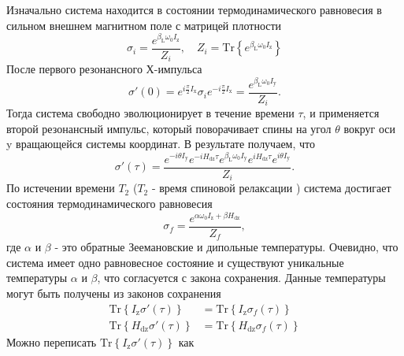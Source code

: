 \documentclass[utf8]{jetp}
\begin{document}
Изначально система находится в состоянии термодинамического равновесия в сильном внешнем магнитном поле с матрицей плотности
%
\begin{equation}
    \label{eq:a1}
   \sigma_{i} = \dfrac{e^{\beta_\mathrm{L} \omega_{0} I_\mathrm{z}}}{Z_{i}} ,
   \quad
   Z_{i} = \mathrm{Tr}\left\{e^{\beta_\mathrm{L} \omega_{0} I_\mathrm{z}} \right\}
\end{equation}
%
После первого резонансного Х-импульса
%
\begin{equation}
    \label{eq:a2}
    \sigma'(0) = e^{ i \frac \pi 2 I_\mathrm{x}}
    \sigma_{i}
    e^{-i \frac \pi 2 I_\mathrm{x}}
    = \dfrac{e^{\beta_\mathrm{L} \omega_{0} I_\mathrm{y}}}{Z_{i}}  .
\end{equation}
%
Тогда система свободно эволюционирует в течение времени $\tau$,
и применяется второй резонансный импульс, который поворачивает спины на угол $\theta$ вокруг оси y вращающейся системы координат.
В результате получаем, что
\begin{equation}
    \label{eq:a3}
    \sigma'(\tau) 
    = \dfrac{
      e^{-i \theta I_\mathrm{y}} e^{-i H_\mathrm{dz} \tau} 
      e^{\beta_\mathrm{L} \omega_{0} I_\mathrm{y}}
      e^{i H_\mathrm{dz} \tau} e^{i \theta I_\mathrm{y}}
    }{Z_{i}}. 
\end{equation}
%
По истечении времени $T_2$ ($T_2$ - время спиновой релаксации \cite{Goldman_1970}) система достигает состояния термодинамического равновесия
\begin{equation}
    \label{eq:a4}
    \sigma_{f} 
    = \dfrac{ e^{\alpha \omega_{0} I_\mathrm{z} + \beta H_\mathrm{dz}} }{Z_f},
\end{equation}
%
где $\alpha$ и $\beta$ - это обратные Зеемановские и дипольные температуры.
Очевидно, что система имеет одно равновесное состояние 
и существуют уникальные температуры $\alpha$ и $\beta$,
что согласуется с закона сохранения.
Данные температуры могут быть получены из законов сохранения
\begin{align}
    \label{eq:a5}
    \mathrm{Tr} \left\{ I_\mathrm{z} \sigma'(\tau) \right\}
    & = \mathrm{Tr} \left\{ I_\mathrm{z} \sigma_{f}(\tau) \right\}
    \\
    \label{eq:a6}
    \mathrm{Tr} \left\{ H_\mathrm{dz} \sigma'(\tau) \right\}
    & = \mathrm{Tr} \left\{ H_\mathrm{dz} \sigma_{f}(\tau) \right\}
\end{align}
%
Можно переписать $\mathrm{Tr} \left\{ I_\mathrm{z} \sigma'(\tau) \right\}$ как
%
\end{document}
